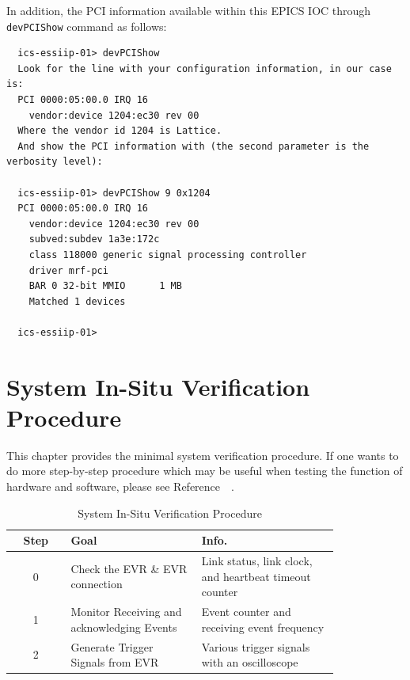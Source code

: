 \documentclass[11pt
  , a4paper
  , article
  , oneside
  , showtrims
]{memoir}
\begin{document}
In addition, the PCI information available within this EPICS IOC through \texttt{devPCIShow} command as follows:
\begin{lstlisting}
  ics-essiip-01> devPCIShow
  Look for the line with your configuration information, in our case is:
  PCI 0000:05:00.0 IRQ 16
    vendor:device 1204:ec30 rev 00
  Where the vendor id 1204 is Lattice.
  And show the PCI information with (the second parameter is the verbosity level):

  ics-essiip-01> devPCIShow 9 0x1204
  PCI 0000:05:00.0 IRQ 16
    vendor:device 1204:ec30 rev 00
    subved:subdev 1a3e:172c
    class 118000 generic signal processing controller
    driver mrf-pci
    BAR 0 32-bit MMIO      1 MB
    Matched 1 devices

  ics-essiip-01>
\end{lstlisting}

\newpage
\chapter{System In-Situ Verification Procedure}
This chapter provides the minimal system verification procedure. If one wants to do more step-by-step procedure which may be useful when testing the function of hardware and software, please see Reference~~\citep[see][p14]{EVR-USER-GUIDE}.

\begin{table}[!htb]
  \centering
  \begin{tabular}{c|p{0.4\linewidth}|p{0.42\linewidth}}
    \toprule
    Step & Goal                                       & Info.                                                  \\\midrule
    0    & Check the EVR \& EVR connection            & Link status, link clock, and heartbeat timeout counter \\\midrule
    1    & Monitor Receiving and acknowledging Events & Event counter and receiving event frequency            \\\midrule
    2    & Generate Trigger Signals from EVR          & Various trigger signals with an oscilloscope           \\\bottomrule
  \end{tabular}
  \caption[]{System In-Situ Verification Procedure}
  \label{table:checklist}
\end{table}
\end{document}
